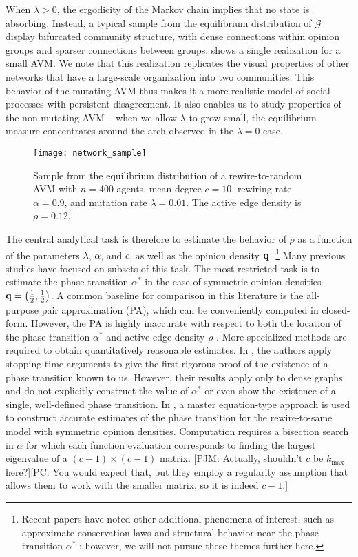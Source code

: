\documentclass[review, onefignum, onetabnum]{siamart171218}
\newcommand{\pjm}[1]{{\color{blue}[PJM: #1]}}
\newcommand{\pc}[1]{{\color{comment_purple}[PC: #1]}}
\begin{document}
		When $\lambda > 0$, the ergodicity of the Markov chain implies that no state is absorbing. 
		Instead, a typical sample from the equilibrium distribution of $\mathcal{G}$ display bifurcated community structure, with dense connections within opinion groups and sparser connections between groups. 
		 shows a single realization for a small AVM. 
		We note that this realization replicates the visual properties of other networks that have a large-scale organization into two communities. 
		This behavior of the mutating AVM thus makes it a more realistic model of social processes with persistent disagreement. 
		It also enables us to study properties of the non-mutating AVM -- when we allow $\lambda$ to grow small, the equilibrium measure concentrates around the arch observed in the $\lambda = 0$ case. 
		\begin{figure}
			\centering
			\texttt{[image: network\_sample]}
			\caption{Sample from the equilibrium distribution of a rewire-to-random AVM with $n = 400$ agents, mean degree $c = 10$, rewiring rate $\alpha = 0.9$, and mutation rate $\lambda = 0.01$. The active edge density is $\rho = 0.12$.} \label{fig:sample}
		\end{figure}
		The central analytical task is therefore to estimate the behavior of $\rho$ as a function of the parameters $\lambda$, $\alpha$, and $c$, as well as the opinion density $\mathbf{q}$.
		\footnote{Recent papers have noted other additional phenomena of interest, such as approximate conservation laws \cite{Toruniewska2017} and structural behavior near the phase transition $\alpha^*$ \cite{Horstmeyer2018}; however, we will not pursue these themes further here.}
		Many previous studies have focused on subsets of this task.
		The most restricted task is to estimate the phase transition $\alpha^*$ in the case of symmetric opinion densities  $\mathbf{q} = \left(\frac{1}{2}, \frac{1}{2}\right)$.
		A common baseline for comparison in this literature is the all-purpose pair approximation (PA), which can be conveniently computed in closed-form. 
		However, the PA is highly inaccurate with respect to both the location of the phase transition $\alpha^*$ and active edge density $\rho$ \cite{Demirel2012, Durrett2012}. 
		More specialized methods are required to obtain quantitatively reasonable estimates. 
		In \cite{Basu2015a}, the authors apply stopping-time arguments to give the first rigorous proof of the existence of a phase transition known to us. 
		However, their results apply only to dense graphs and do not explicitly construct the value of $\alpha^*$ or even show the existence of a single, well-defined phase transition. 
		In \cite{Bohme2011}, a master equation-type approach is used to construct accurate estimates of the phase transition for the rewire-to-same model with symmetric opinion densities. 
		Computation requires a bisection search in $\alpha$ for which each function evaluation corresponds to finding the largest eigenvalue of a $(c-1) \times (c-1)$ matrix. \pjm{Actually, shouldn't $c$ be $k_\mathrm{max}$ here?}\pc{You would expect that, but they employ a regularity assumption that allows them to work with the smaller matrix, so it is indeed $c-1$.}
		
\end{document}
